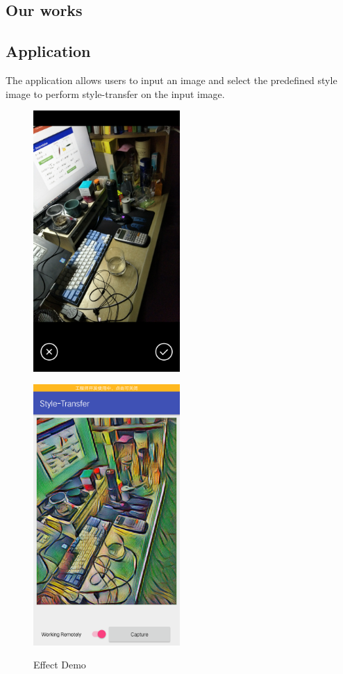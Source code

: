 \documentclass[a4paper,11pt,onecolumn,twoside]{article}
\begin{document}
\begin{CJK*}{GBK}{song}
\section{Our works}
\subsection{Application}
The application allows users to input an image and select the predefined
style image to perform style-transfer on the input image. 


\begin{figure}
  \begin{minipage}[t]{0.5\linewidth}
    \centering
    \includegraphics[width=2.2in]{origin}
    \label{fig:origin}
    \end{minipage}%
    \begin{minipage}[t]{0.5\linewidth}
    \centering
    \includegraphics[width=2.2in]{transfer}
    \label{fig:transfer}
  \end{minipage}
  \caption{Effect Demo}
\end{figure}


\end{CJK*}
\end{document}
